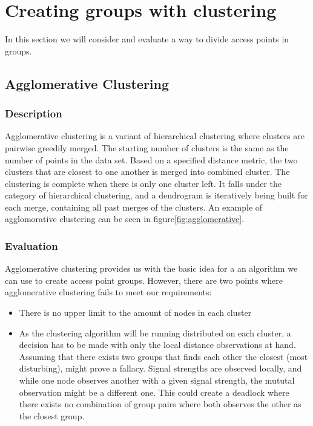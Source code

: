 \section{Creating groups with clustering}
In this section we will consider and evaluate a way to divide access points in groups.

\subsection {Agglomerative Clustering}
\subsubsection{Description}
Agglomerative clustering  \cite{agglomerative} is a variant of hierarchical clustering where clusters are pairwise greedily merged. The starting number of clusters is the same as the number of
points in the data set. Based on a specified distance metric, the two clusters that are closest to one another is merged into combined cluster. The clustering is complete
when there is only one cluster left. It falls under the category of hierarchical clustering, and a dendrogram is iteratively being built for each merge,
containing all past merges of the clusters. An example of agglomorative clustering can be seen in {{figure}}\ref{fig:agglomerative}.

\subsubsection{Evaluation}
Agglomerative clustering provides us with the basic idea for a an algorithm we can use to create access point groups. However, there are two points where agglomerative clustering
fails to meet our requirements: 
\begin{itemize}
	\item There is no upper limit to the amount of nodes in each cluster
	\item As the clustering algorithm will be running distributed  on each cluster, a decision has to be made with only the local distance observations at hand.
		Assuming that there exists two groups that finds each other the closest (most disturbing), might prove a fallacy. Signal strengths are observed locally, and while one node observes another with a given signal strength,
		the mututal observation might be a different one. This could create a deadlock where there exists no combination of group pairs where both observes the other
		as the closest group. 
\end{itemize}

